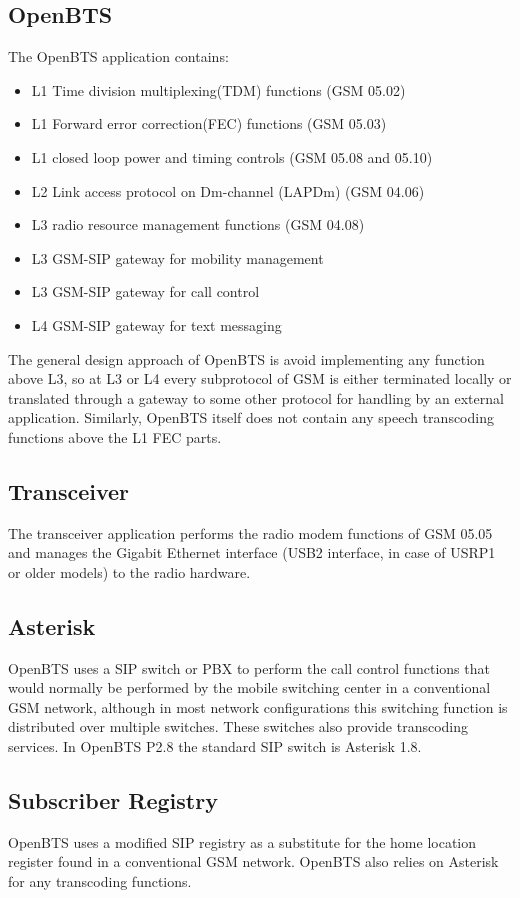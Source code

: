  \subsection{OpenBTS}
The OpenBTS application contains:
\begin{itemize}
	\item L1 Time division multiplexing(TDM) functions (GSM 05.02)
	\item L1 Forward error correction(FEC) functions (GSM 05.03)
	\item L1 closed loop power and timing controls (GSM 05.08 and 05.10)
	\item L2 Link access protocol on Dm-channel (LAPDm)  (GSM 04.06)
	\item L3 radio resource management functions (GSM 04.08)
	\item L3 GSM-SIP gateway for mobility management
	\item L3 GSM-SIP gateway for call control
	\item L4 GSM-SIP gateway for text messaging
\end{itemize}

The general design approach of OpenBTS is avoid implementing any function above L3, so at L3 or L4 every subprotocol of GSM is either terminated locally or translated through a gateway to some other protocol for handling by an external application. Similarly, OpenBTS itself does not contain any speech transcoding functions above the L1 FEC parts.

\subsection{Transceiver}
The transceiver application performs the radio modem functions of GSM 05.05 and manages the Gigabit Ethernet interface
(USB2 interface, in case
of USRP1 or older models) to the radio hardware.

\subsection{Asterisk}
OpenBTS uses a SIP switch or PBX to perform the call control functions that would normally be performed by the mobile switching center in a conventional GSM network, although in most network configurations this switching function is distributed over multiple switches. These switches also provide transcoding services. In OpenBTS P2.8 the standard SIP switch is Asterisk 1.8.

\subsection{Subscriber Registry}
OpenBTS uses a modified SIP registry as a substitute for the home location register found in a conventional GSM network. OpenBTS also relies on Asterisk for any transcoding functions. 

